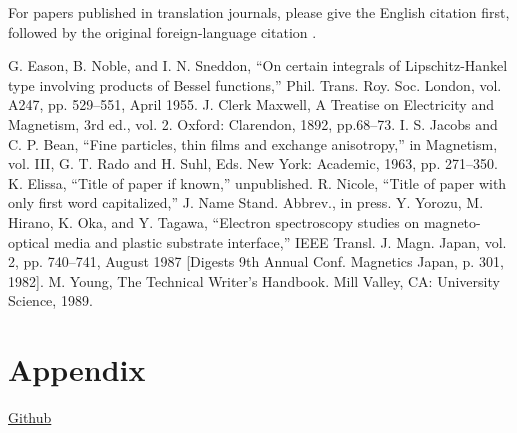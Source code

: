 \documentclass[conference]{IEEEtran}
\begin{document}
For papers published in translation journals, please give the English 
citation first, followed by the original foreign-language citation \cite{b6}.

\begin{thebibliography}{00}
 G. Eason, B. Noble, and I. N. Sneddon, ``On certain integrals of Lipschitz-Hankel type involving products of Bessel functions,'' Phil. Trans. Roy. Soc. London, vol. A247, pp. 529--551, April 1955.
 J. Clerk Maxwell, A Treatise on Electricity and Magnetism, 3rd ed., vol. 2. Oxford: Clarendon, 1892, pp.68--73.
 I. S. Jacobs and C. P. Bean, ``Fine particles, thin films and exchange anisotropy,'' in Magnetism, vol. III, G. T. Rado and H. Suhl, Eds. New York: Academic, 1963, pp. 271--350.
 K. Elissa, ``Title of paper if known,'' unpublished.
 R. Nicole, ``Title of paper with only first word capitalized,'' J. Name Stand. Abbrev., in press.
 Y. Yorozu, M. Hirano, K. Oka, and Y. Tagawa, ``Electron spectroscopy studies on magneto-optical media and plastic substrate interface,'' IEEE Transl. J. Magn. Japan, vol. 2, pp. 740--741, August 1987 [Digests 9th Annual Conf. Magnetics Japan, p. 301, 1982].
 M. Young, The Technical Writer's Handbook. Mill Valley, CA: University Science, 1989.
\end{thebibliography}
\section{Appendix}
\href{https://github.com/ABHIRAMSHIBU/BlockChainDataStore}{Github}
\end{document}

